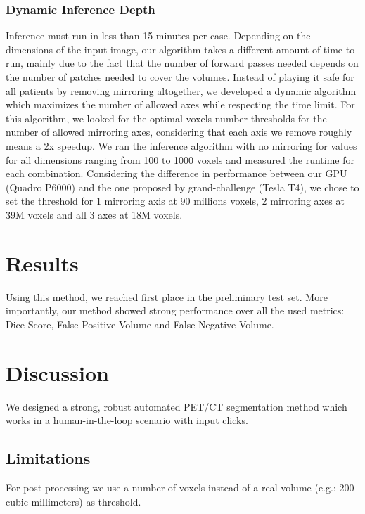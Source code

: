\documentclass[runningheads]{llncs}
\begin{document}
\subsubsection{Dynamic Inference Depth}
Inference must run in less than 15 minutes per case.
Depending on the dimensions of the input image, our algorithm takes a different amount of time to run, mainly due to the fact that the number of forward passes needed depends on the number of patches needed to cover the volumes.
Instead of playing it safe for all patients by removing mirroring altogether, we developed a dynamic algorithm which maximizes the number of allowed axes while respecting the time limit.
For this algorithm, we looked for the optimal voxels number thresholds for the number of allowed mirroring axes, considering that each axis we remove roughly means a 2x speedup.
We ran the inference algorithm with no mirroring for values for all dimensions ranging from 100 to 1000 voxels and measured the runtime for each combination.
Considering the difference in performance between our GPU (Quadro P6000) and the one proposed by grand-challenge (Tesla T4), we chose to set the threshold for 1 mirroring axis at 90 millions voxels, 2 mirroring axes at 39M voxels and all 3 axes at 18M voxels.

\section{Results}
Using this method, we reached first place in the preliminary test set.
More importantly, our method showed strong performance over all the used metrics: Dice Score, False Positive Volume and False Negative Volume.

\section{Discussion}
We designed a strong, robust automated PET/CT segmentation method which works in a human-in-the-loop scenario with input clicks. 
\subsection{Limitations}
For post-processing we use a number of voxels instead of a real volume (e.g.: 200 cubic millimeters) as threshold.

%
%
%


%
\end{document}
